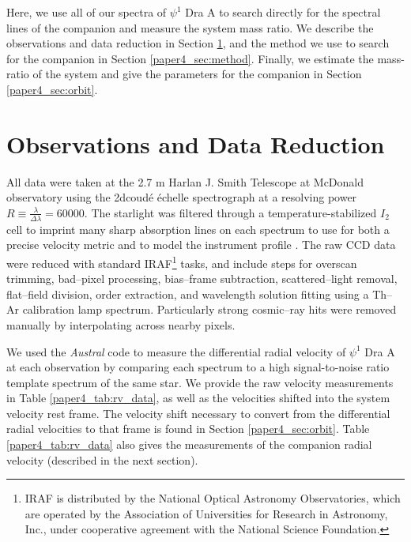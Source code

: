 Here, we use all of our spectra of $\psi^1$ Dra A to search directly for the spectral lines of the companion and measure the system mass ratio. We describe the observations and data reduction in Section \ref{paper4_sec:obs}, and the method we use to search for the companion in Section \ref{paper4_sec:method}. Finally, we estimate the mass-ratio of the system and give the parameters for the companion in Section \ref{paper4_sec:orbit}.


\section{Observations and Data Reduction}
\label{paper4_sec:obs}
All data were taken at the 2.7 m Harlan J. Smith Telescope at McDonald observatory using the 2dcoud\'e \'echelle spectrograph \citep{TS23} at a resolving power $R\equiv \frac{\lambda}{\Delta \lambda} = 60000$. The starlight was filtered through a temperature-stabilized $I_2$ cell to imprint many sharp absorption lines on each spectrum to use for both a precise velocity metric \citep{Butler1996} and to model the instrument profile \citep{Endl2000}. The raw CCD data were reduced with standard IRAF\footnote{IRAF is distributed by the National Optical Astronomy Observatories, which are operated by the Association of Universities for Research in Astronomy, Inc., under cooperative agreement with the National Science Foundation.} tasks, and include steps for overscan trimming, bad--pixel processing, bias--frame subtraction, scattered--light removal, flat--field division, order extraction, and wavelength solution fitting using a Th--Ar calibration lamp spectrum. Particularly strong cosmic--ray hits were removed manually by interpolating across nearby pixels.

We used the \emph{Austral} code \citep{Endl2000} to measure the differential radial velocity of $\psi^1$ Dra A at each observation by comparing each spectrum to a high signal-to-noise ratio template spectrum of the same star. We provide the raw velocity measurements in Table \ref{paper4_tab:rv_data}, as well as the velocities shifted into the system velocity rest frame. The velocity shift necessary to convert from the differential radial velocities to that frame is found in Section \ref{paper4_sec:orbit}. Table \ref{paper4_tab:rv_data} also gives the measurements of the companion radial velocity (described in the next section).


